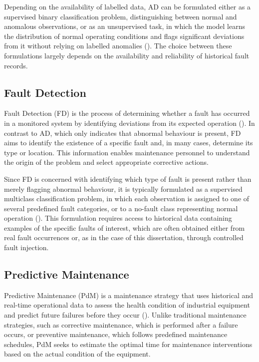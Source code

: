 Depending on the availability of labelled data, AD can be formulated either as a supervised binary classification problem, distinguishing between normal and 
anomalous observations, or as an unsupervised task, in which the model learns the distribution of normal operating conditions and flags significant 
deviations from it without relying on labelled anomalies (\cite{Chandola2009,Darban2025}). The choice between these formulations largely depends on the availability and 
reliability of historical fault records.

\subsection{Fault Detection} \label{sec:fd}

Fault Detection (FD) is the process of determining whether a fault has occurred in a monitored system by identifying deviations from its expected 
operation (\cite{Isermann2006}). In contrast to AD, which only indicates that abnormal behaviour is present, FD aims to identify the 
existence of a specific fault and, in many cases, determine its type or location. This information enables maintenance personnel to understand the origin of the 
problem and select appropriate corrective actions.

Since FD is concerned with identifying which type of fault is present rather than merely flagging abnormal behaviour, it is typically formulated as a supervised 
multiclass classification problem, in which each observation is assigned to one of several predefined fault categories, or to a no-fault class representing 
normal operation (\cite{Isermann2006}). This formulation requires access to historical data containing examples of the specific faults of interest, which are 
often obtained either from real fault occurrences or, as in the case of this dissertation, through controlled fault injection.

\subsection{Predictive Maintenance} \label{sec:pdm}

Predictive Maintenance (PdM) is a maintenance strategy that uses historical and real-time operational data to assess the health condition of industrial 
equipment and predict future failures before they occur (\cite{Carvalho2019}). Unlike traditional maintenance strategies, such as corrective maintenance, which 
is performed after a failure occurs, or preventive maintenance, which follows predefined maintenance schedules, PdM seeks to estimate the optimal time for 
maintenance interventions based on the actual condition of the equipment.


